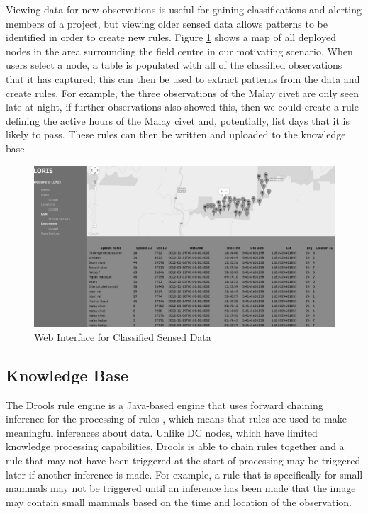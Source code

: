 		Viewing data for new observations is useful for gaining classifications and alerting members of a project, but viewing older sensed data allows patterns to be identified in order to create new rules. Figure \ref{kc:loris_data} shows a map of all deployed nodes in the area surrounding the field centre in our motivating scenario. When users select a node, a table is populated with all of the classified observations that it has captured; this can then be used to extract patterns from the data and create rules. For example, the three observations of the Malay civet are only seen late at night, if further observations also showed this, then we could create a rule defining the active hours of the Malay civet and, potentially, list days that it is likely to pass. These rules can then be written and uploaded to the knowledge base.
		\begin{figure}[h]
		\centering
		\includegraphics[width=\textwidth]{Chap4/figures/loris_data}
		\caption{Web Interface for Classified Sensed Data}
		\label{kc:loris_data}
		\end{figure}

	\subsection{Knowledge Base}\label{arch:kb}
	The Drools rule engine is a Java-based engine that uses forward chaining inference for the processing of rules \cite{proctor2005drools}, which means that rules are used to make meaningful inferences about data. Unlike DC nodes, which have limited knowledge processing capabilities, Drools is able to chain rules together and a rule that may not have been triggered at the start of processing may be triggered later if another inference is made. For example, a rule that is specifically for small mammals may not be triggered until an inference has been made that the image may contain small mammals based on the time and location of the observation.
	
